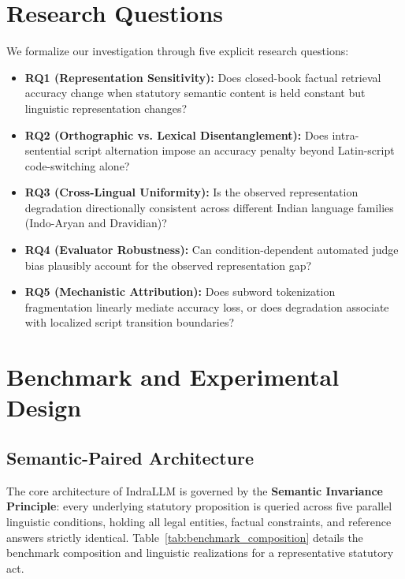 \documentclass[11pt]{article}
\begin{document}
\section{Research Questions}
\label{sec:rqs}

We formalize our investigation through five explicit research questions:
\begin{itemize}
    \item \textbf{RQ1 (Representation Sensitivity):} Does closed-book factual retrieval accuracy change when statutory semantic content is held constant but linguistic representation changes?
    \item \textbf{RQ2 (Orthographic vs. Lexical Disentanglement):} Does intra-sentential script alternation impose an accuracy penalty beyond Latin-script code-switching alone?
    \item \textbf{RQ3 (Cross-Lingual Uniformity):} Is the observed representation degradation directionally consistent across different Indian language families (Indo-Aryan and Dravidian)?
    \item \textbf{RQ4 (Evaluator Robustness):} Can condition-dependent automated judge bias plausibly account for the observed representation gap?
    \item \textbf{RQ5 (Mechanistic Attribution):} Does subword tokenization fragmentation linearly mediate accuracy loss, or does degradation associate with localized script transition boundaries?
\end{itemize}

\section{Benchmark and Experimental Design}
\label{sec:benchmark}



\subsection{Semantic-Paired Architecture}
The core architecture of IndraLLM is governed by the \textbf{Semantic Invariance Principle}: every underlying statutory proposition is queried across five parallel linguistic conditions, holding all legal entities, factual constraints, and reference answers strictly identical. Table~\ref{tab:benchmark_composition} details the benchmark composition and linguistic realizations for a representative statutory act.
\end{document}
